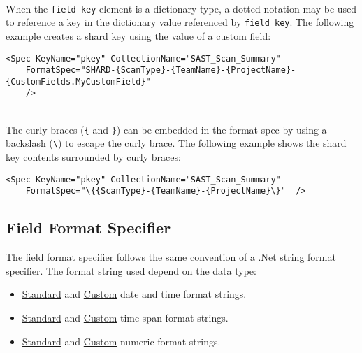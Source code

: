 \noindent\\When the \texttt{field key} element is a dictionary type, a dotted notation may be used to reference a key in the dictionary
value referenced by \texttt{field key}.  The following example creates a shard key using the value of a custom field:

\begin{lstlisting}
<Spec KeyName="pkey" CollectionName="SAST_Scan_Summary" 
    FormatSpec="SHARD-{ScanType}-{TeamName}-{ProjectName}-{CustomFields.MyCustomField}"
    />
\end{lstlisting}


\noindent\\The curly braces (\texttt{\{} and \texttt{\}}) can be embedded in the format spec by using a backslash (\texttt{\textbackslash}) to escape 
the curly brace.  The following example shows the shard key contents surrounded by curly braces:

\begin{lstlisting}
<Spec KeyName="pkey" CollectionName="SAST_Scan_Summary"
    FormatSpec="\{{ScanType}-{TeamName}-{ProjectName}\}"  />
\end{lstlisting}

\subsection{Field Format Specifier}

The field format specifier follows the same convention of a .Net string format specifier.  The format string used depend on the data type:

\begin{itemize}
    \item\href{https://docs.microsoft.com/en-us/dotnet/standard/base-types/standard-date-and-time-format-strings}{Standard} and \href{https://docs.microsoft.com/en-us/dotnet/standard/base-types/custom-date-and-time-format-strings}{Custom} date and time format strings.
    \item\href{https://docs.microsoft.com/en-us/dotnet/standard/base-types/standard-timespan-format-strings}{Standard} and \href{https://docs.microsoft.com/en-us/dotnet/standard/base-types/custom-timespan-format-strings}{Custom} time span format strings.
    \item\href{https://docs.microsoft.com/en-us/dotnet/standard/base-types/standard-numeric-format-strings}{Standard} and \href{https://docs.microsoft.com/en-us/dotnet/standard/base-types/custom-numeric-format-strings}{Custom} numeric format strings.
\end{itemize}


